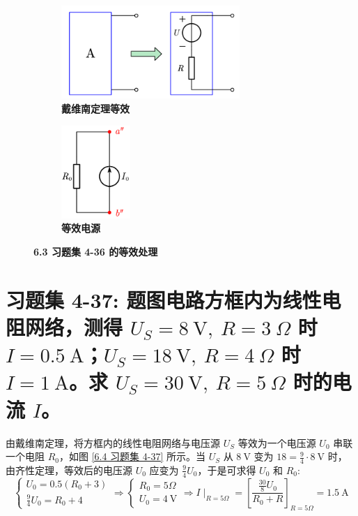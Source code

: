 \documentclass[UTF8]{report}
\theoremstyle{MyLineTheoremStyle} %
\theoremstyle{MyBlockTheoremStyle} %
\theoremstyle{MySubsubsectionStyle} %
\begin{document}
\begin{figure}[H]\centering
\begin{subfigure}[t]{0.6\columnwidth}\centering
    \includegraphics[height=100pt]{assets/6/acd560ff4ae20eb901019a90b84ef837.png}
    \caption{\bfseries 戴维南定理等效 }
\end{subfigure}\hfill
\begin{subfigure}[t]{0.4\columnwidth}\centering
    \includegraphics[height=100pt]{assets/6/7367192b138adaf93ddf5c5fcc94a53b.png}
    \caption{\bfseries 等效电源 }
\end{subfigure}
\caption{\bfseries 6.3 习题集 4-36 的等效处理}\label{6.3 习题集 4-36.2}
\end{figure}

\section{习题集 4-37: 题图电路方框内为线性电阻网络，测得 $U_S = 8 \ \mathrm{V},\ R = 3 \ \Omega$ 时 $I = 0.5 \ \mathrm{A}$；$U_S = 18 \ \mathrm{V},\ R = 4 \ \Omega$ 时 $I = 1 \ \mathrm{A}$。求 $U_S = 30 \ \mathrm{V},\ R = 5 \ \Omega$ 时的电流 $I$。}

由戴维南定理，将方框内的线性电阻网络与电压源 $U_S$ 等效为一个电压源 $U_0$ 串联一个电阻 $R_0$，如图 \ref{6.4 习题集 4-37} 所示。当 $U_S$ 从 $8 \ \mathrm{V}$ 变为 $18 = \frac{9}{4} \cdot 8\ \mathrm{V}$ 时，由齐性定理，等效后的电压源 $U_0$ 应变为 $\frac{9}{4}U_0$，于是可求得 $U_0$ 和 $R_0$:
\begin{equation}
\begin{cases}
    U_0 = 0.5 (R_0 + 3)\\ 
    \frac{9}{4}U_0 =  R_0 + 4
\end{cases} 
\Longrightarrow 
\begin{cases}
    R_0 = 5 \Omega \\ 
    U_0 = 4 \ \mathrm{V}
\end{cases}
\Longrightarrow 
\boxed{
    I\mid_{R = 5 \Omega} = \left[\frac{ \frac{30}{8} U_0}{R_0 + R}\right]_{R = 5 \Omega} = 1.5 \ \mathrm{A}
}
\end{equation}
\end{document}
